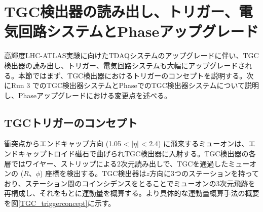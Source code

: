 \section{TGC検出器の読み出し、トリガー、電気回路システムとPhase\two アップグレード}
\label{sec_TGCtrigger}
高輝度LHC-ATLAS実験に向けたTDAQシステムのアップグレードに伴い、TGC検出器の読み出し、トリガー、電気回路システムも大幅にアップグレードされる。本節ではまず、TGC検出器におけるトリガーのコンセプトを説明する。次にRun 3 でのTGC検出器システムとPhase\two でのTGC検出器システムについて説明し、Phase\two アップグレードにおける変更点を述べる。

    \subsection{TGCトリガーのコンセプト}
    \label{subsec_trigger_concept}
衝突点からエンドキャップ方向  (1.05 < |$\eta$| < 2.4) に飛来するミューオンは、エンドキャップトロイド磁石で曲げられTGC検出器に入射する。TGC検出器の各層ではワイヤー、ストリップによる2次元読み出しで、TGCを通過したミューオンの  ($R$、$\phi$) 座標を検出する。TGC検出器は$z$方向に3つのステーションを持っており、ステーション間のコインシデンスをとることでミューオンの3次元飛跡を再構成し、それをもとに運動量を概算する。より具体的な運動量概算手法の概要を図\ref{TGC_triggerconcept}に示す。

